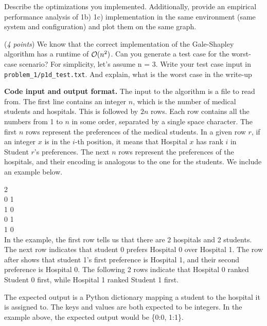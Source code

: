 \documentclass{hw}
\newcommand{\io}{\textbf{Code input and output format.} }
\begin{document}
\begin{problem}
\begin{subproblem}
    Describe the optimizations you implemented. Additionally, provide an empirical performance analysis of 1b) 1c) implementation in the same environment (same system and configuration) and plot them on the same graph. 
\end{subproblem}

\begin{subproblem}
\newcommand{\worstrank}{{\tt wr}}
  (\textit{4 points})
    We know that the correct implementation of the Gale-Shapley algorithm has a runtime of $\mathcal{O}(n^2)$.  Can you generate a test case for the worst-case scenario? For simplicity, let's assume n = 3. Write your test case input in \texttt{problem\_1/p1d\_test.txt}. And explain, what is the worst case in the write-up
\end{subproblem}

\io The input to the algorithm is a file to read from.
The first line contains an integer $n$,
which is the number of medical students and hospitals. This is followed by $2n$ rows.
Each row contains all the numbers from 1 to $n$ in some order, separated by a single
space character. The first $n$ rows represent the preferences of the medical students.
In a given row $r$, if an integer $x$ is in the $i$-th position, it means that Hospital $x$
has rank $i$ in Student $r$'s preferences. The next $n$ rows represent the preferences of
the hospitals, and their encoding is analogous to the one for the students. We include an
example below.

2\\
0 1\\
1 0\\
0 1\\
1 0\\
In the example, the first row tells us that there are 2 hospitals and 2 students.
The next row indicates that student 0 prefers Hospital 0 over Hospital 1. The row after
shows that student 1's first preference is Hospital 1, and their second preference is Hospital 0.
The following 2 rows indicate that Hospital 0 ranked Student 0 first, while Hospital 1 ranked
Student 1 first.

The expected output is a Python dictionary mapping a student to the hospital it is assigned to.
The keys and values are both expected to be integers. In the example above, the expected output
would be
\{0:0, 1:1\}.

\end{problem}


\newpage
\end{document}
